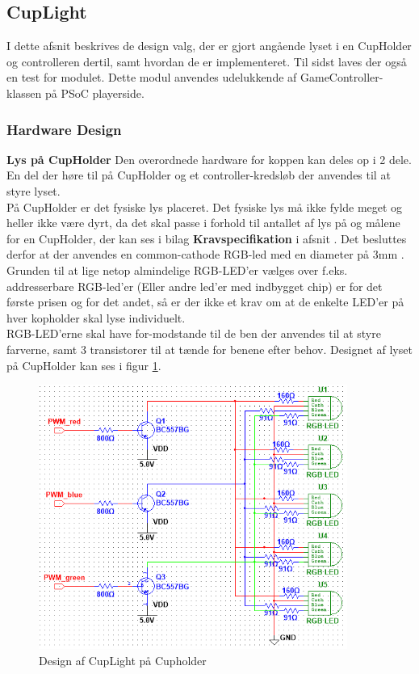 \documentclass[Rapport/Rapport_main.tex]{subfiles}
\begin{document}
\subsection{CupLight}\label{sec:rap_cup_light}
I dette afsnit beskrives de design valg, der er gjort angående lyset i en CupHolder og controlleren dertil, samt hvordan de er implementeret. Til sidst laves der også en test for modulet. Dette modul anvendes udelukkende af GameController-klassen på PSoC playerside.
\subsubsection{Hardware Design}
\textbf{Lys på CupHolder}
Den overordnede hardware for koppen kan deles op i 2 dele. En del der høre til på CupHolder og et controller-kredsløb der anvendes til at styre lyset.\\
På CupHolder er det fysiske lys placeret. Det fysiske lys må ikke fylde meget og heller ikke være dyrt, da det skal passe i forhold til antallet af lys på og målene for en CupHolder, der kan ses i bilag \textbf{Kravspecifikation} i afsnit . Det besluttes derfor at der anvendes en common-cathode RGB-led med en diameter på 3mm \cite{RGBledDatasheet}. Grunden til at lige netop almindelige RGB-LED'er vælges over f.eks. addresserbare RGB-led'er (Eller andre led'er med indbygget chip) er for det første prisen og for det andet, så er der ikke et krav om at de enkelte LED'er på hver kopholder skal lyse individuelt.\\
RGB-LED'erne skal have for-modstande til de ben der anvendes til at styre farverne, samt 3 transistorer\cite{datasheet_bc557b} til at tænde for benene efter behov. Designet af lyset på CupHolder kan ses i figur \ref{fig:rap_cupholder_light}.
\begin{figure}[H]
    \centering
    \includegraphics[width=0.9\textwidth]{HardwareDesign/CupLight/graphics/CupHolder_HW.png}
    \caption{Design af CupLight på Cupholder}
    \label{fig:rap_cupholder_light}
\end{figure}
\end{document}
